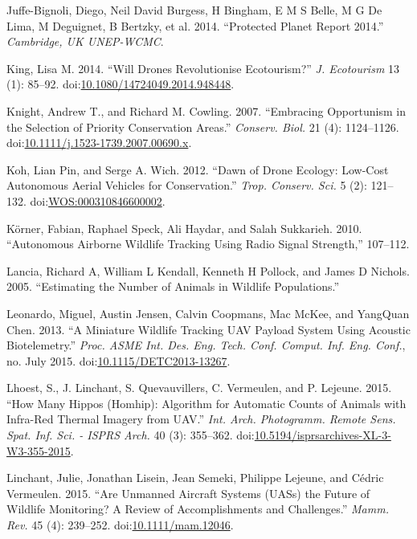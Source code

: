 \documentclass[]{interact}
\theoremstyle{plain}%
\theoremstyle{definition}
\theoremstyle{remark}
\begin{document}
\hypertarget{ref-juffe-bignoli_protected_2014}{}
Juffe-Bignoli, Diego, Neil David Burgess, H Bingham, E M S Belle, M G De
Lima, M Deguignet, B Bertzky, et al. 2014. ``Protected Planet Report
2014.'' \emph{Cambridge, UK UNEP-WCMC}.

\hypertarget{ref-king_will_2014}{}
King, Lisa M. 2014. ``Will Drones Revolutionise Ecotourism?'' \emph{J.
Ecotourism} 13 (1): 85--92.
doi:\href{https://doi.org/10.1080/14724049.2014.948448}{10.1080/14724049.2014.948448}.

\hypertarget{ref-knight_embracing_2007}{}
Knight, Andrew T., and Richard M. Cowling. 2007. ``Embracing Opportunism
in the Selection of Priority Conservation Areas.'' \emph{Conserv. Biol.}
21 (4): 1124--1126.
doi:\href{https://doi.org/10.1111/j.1523-1739.2007.00690.x}{10.1111/j.1523-1739.2007.00690.x}.

\hypertarget{ref-koh_dawn_2012}{}
Koh, Lian Pin, and Serge A. Wich. 2012. ``Dawn of Drone Ecology:
Low-Cost Autonomous Aerial Vehicles for Conservation.'' \emph{Trop.
Conserv. Sci.} 5 (2): 121--132.
doi:\href{https://doi.org/WOS:000310846600002}{WOS:000310846600002}.

\hypertarget{ref-korner_autonomous_2010}{}
Körner, Fabian, Raphael Speck, Ali Haydar, and Salah Sukkarieh. 2010.
``Autonomous Airborne Wildlife Tracking Using Radio Signal Strength,''
107--112.

\hypertarget{ref-lancia_estimating_2005}{}
Lancia, Richard A, William L Kendall, Kenneth H Pollock, and James D
Nichols. 2005. ``Estimating the Number of Animals in Wildlife
Populations.''

\hypertarget{ref-leonardo_miniature_2013}{}
Leonardo, Miguel, Austin Jensen, Calvin Coopmans, Mac McKee, and
YangQuan Chen. 2013. ``A Miniature Wildlife Tracking UAV Payload System
Using Acoustic Biotelemetry.'' \emph{Proc. ASME Int. Des. Eng. Tech.
Conf. Comput. Inf. Eng. Conf.}, no. July 2015.
doi:\href{https://doi.org/10.1115/DETC2013-13267}{10.1115/DETC2013-13267}.

\hypertarget{ref-lhoest_how_2015}{}
Lhoest, S., J. Linchant, S. Quevauvillers, C. Vermeulen, and P. Lejeune.
2015. ``How Many Hippos (Homhip): Algorithm for Automatic Counts of
Animals with Infra-Red Thermal Imagery from UAV.'' \emph{Int. Arch.
Photogramm. Remote Sens. Spat. Inf. Sci. - ISPRS Arch.} 40 (3):
355--362.
doi:\href{https://doi.org/10.5194/isprsarchives-XL-3-W3-355-2015}{10.5194/isprsarchives-XL-3-W3-355-2015}.

\hypertarget{ref-linchant_are_2015}{}
Linchant, Julie, Jonathan Lisein, Jean Semeki, Philippe Lejeune, and
Cédric Vermeulen. 2015. ``Are Unmanned Aircraft Systems (UASs) the
Future of Wildlife Monitoring? A Review of Accomplishments and
Challenges.'' \emph{Mamm. Rev.} 45 (4): 239--252.
doi:\href{https://doi.org/10.1111/mam.12046}{10.1111/mam.12046}.
\end{document}
